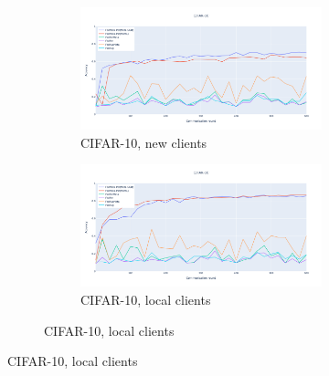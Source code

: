 \begin{figure}
    \centering
    \begin{subfigure}{\textwidth}
        \centering
        \begin{subfigure}{.5\textwidth}
            \centering
            \includegraphics[width=\linewidth]{./tab_img/cifar_per_new.png}
            \caption{CIFAR-10, new clients}
            \label{fig:cifar_per_new}
        \end{subfigure}%
        \begin{subfigure}{.5\textwidth}
            \centering
            \includegraphics[width=\linewidth]{./tab_img/cifar_per_old.png}
            \caption{CIFAR-10, local clients}
            \label{fig:cifar_per_old}
        \end{subfigure}
    \end{subfigure}


\end{figure}
